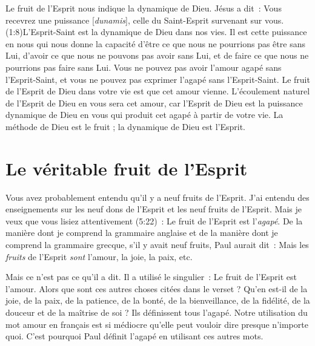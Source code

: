 \Og Le fruit de l'Esprit \Fg{} nous indique la dynamique de Dieu.
 Jésus a dit~: \Og Vous recevrez une puissance [\emph{dunamis}],
 celle du Saint-Esprit survenant sur vous. \Fg{}
 (1:8)L'Esprit-Saint est la dynamique de Dieu dans nos vies.
 Il est cette puissance en nous qui nous donne la capacité
 d'être ce que nous ne pourrions pas être sans Lui,
 d'avoir ce que nous ne pouvons pas avoir sans Lui,
 et de faire ce que nous ne pourrions pas faire sans Lui.
 Vous ne pouvez pas avoir l'amour agapé sans l'Esprit-Saint,
 et vous ne pouvez pas exprimer l'agapé sans l'Esprit-Saint.
 Le fruit de l'Esprit de Dieu dans votre vie est que cet amour vienne.
 L'écoulement naturel de l'Esprit de Dieu en vous sera cet amour,
 car l'Esprit de Dieu est la puissance dynamique de Dieu
 en vous qui produit cet agapé à partir de votre vie.
 La méthode de Dieu est le fruit ; la dynamique de Dieu est l'Esprit.


\section{Le v\'eritable fruit de l'Esprit}

Vous avez probablement entendu qu'il y a neuf fruits de l'Esprit.
 J'ai entendu des enseignements sur les neuf dons de l'Esprit
 et les neuf fruits de l'Esprit. Mais je veux que vous lisiez
 attentivement (5:22)~:
 \Og Le fruit de l'Esprit est l'\emph{agapé}. \Fg{}
 De la manière dont je comprend la grammaire anglaise
 et de la manière dont je comprend la grammaire grecque,
 s'il y avait neuf fruits, Paul aurait dit~:
 \Og Mais les \emph{fruits} de l'Esprit \emph{sont} l'amour,
 la joie, la paix, etc. \Fg{}

Mais ce n'est pas ce qu'il a dit. Il a utilisé le singulier~:
 \Og Le fruit de l'Esprit est l'amour. \Fg{}
 Alors que sont ces autres choses citées dans le verset ?
 Qu'en est-il de la joie, de la paix, de la patience, de la bonté,
 de la bienveillance, de la fidélité, de la douceur
 et de la maîtrise de soi ? Ils définissent tous l'agapé.
 Notre utilisation du mot \Og amour \Fg{} en français est si médiocre
 qu'elle peut vouloir dire presque n'importe quoi.
 C'est pourquoi Paul définit l'agapé en utilisant ces autres mots.

